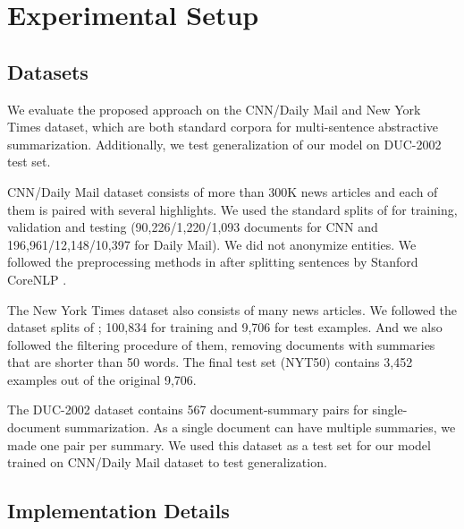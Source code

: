 \documentclass[11pt,a4paper]{article}
\begin{document}
\section{Experimental Setup}

\subsection{Datasets}

We evaluate the proposed approach on the CNN/Daily Mail \cite{NIPS2015_5945} and
New York Times \cite{sandhaus2008nyt} dataset, which are both standard corpora
for multi-sentence abstractive summarization. Additionally, we test
generalization of our model on DUC-2002 test set.

CNN/Daily Mail dataset consists of more than 300K news articles and
each of them is paired with several highlights.
We used the standard splits of \citet{NIPS2015_5945}
for training, validation and testing (90,226/1,220/1,093 documents for CNN and
196,961/12,148/10,397 for Daily Mail). We did not anonymize entities.
We followed the preprocessing methods in \citet{see-etal-2017-get}
after splitting sentences by Stanford CoreNLP \cite{manning-EtAl:2014:P14-5}.

The New York Times dataset also consists of many news articles.
We followed the dataset splits of \citet{durrett-etal-2016-learning};
100,834 for training and 9,706 for test examples.
And we also followed the filtering procedure of them, removing
documents with summaries that are shorter than 50 words.
The final test set (NYT50) contains 3,452 examples out of the original 9,706.

The DUC-2002 dataset contains 567 document-summary pairs
for single-document summarization. As a single document can
have multiple summaries, we made one pair per summary.
We used this dataset as a test set for our model trained on
CNN/Daily Mail dataset to test generalization.

\subsection{Implementation Details}
\end{document}

